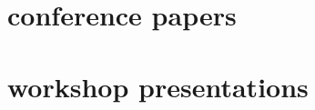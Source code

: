 \documentclass[10pt,oneside]{article}
\begin{document}
\section{conference papers}

\mbox{}\vspace{-\dimexpr\baselineskip\relax}
\vspace*{-1em}
\printbibliography[type=inproceedings, heading=none]


\section{workshop presentations}

\mbox{}\vspace{-\dimexpr\baselineskip\relax}
\end{document}

